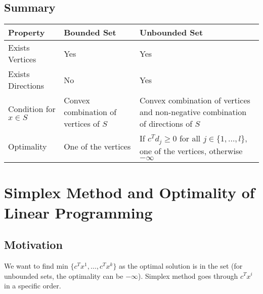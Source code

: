 \documentclass{article}
\theoremstyle{definition}
\begin{document}
    \subsection{Summary}
	\begin{tabular}{ | m{10em} | m{10em} | m{20em} | } 
    	\hline
    	Property & Bounded Set & Unbounded Set \\
    	\hline
    	Exists Vertices & Yes & Yes \\
    	\hline
    	Exists Directions & No & Yes \\
    	\hline
    	Condition for $x \in S$ & Convex combination of vertices of $S$ & Convex combination of vertices and non-negative combination of directions of $S$ \\
    	\hline
    	Optimality & One of the vertices & If $c^Td_j \geq 0$ for all $j \in \{1,\dots,l\}$, one of the vertices, otherwise $-\infty$ \\
    	\hline
    \end{tabular}
    
    \break
	\section{Simplex Method and Optimality of Linear Programming}
	\subsection{Motivation}
	We want to find min $\{c^Tx^1, \dots, c^Tx^k\}$ as the optimal solution is in the set (for unbounded sets, the optimality can be $-\infty$). Simplex method goes through $c^Tx^i$ in a specific order.
\end{document}
